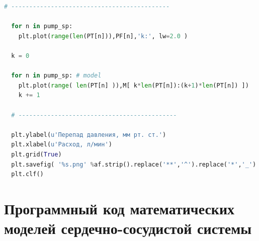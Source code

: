 \begin{lstlisting}[language=Python,caption={Процедура оптимизации на основе алгоритма дифференциальной эволюции на языке программирования Python},label={list:optimization_routine_diff}]
# --------------------------------------------

  for n in pump_sp: 
    plt.plot(range(len(PT[n])),PF[n],'k:', lw=2.0 )

  k = 0

  for n in pump_sp: # model
    plt.plot(range( len(PT[n] )),M[ k*len(PT[n]):(k+1)*len(PT[n]) ])
    k += 1

  # --------------------------------------------

  plt.ylabel(u'Перепад давления, мм рт. ст.')
  plt.xlabel(u'Расход, л/мин')
  plt.grid(True)
  plt.savefig( '%s.png' %af.strip().replace('**','^').replace('*','_') )
  plt.clf()

\end{lstlisting}


\chapter{Программный код математических моделей сердечно-сосудистой системы} \label{AppendixB}

